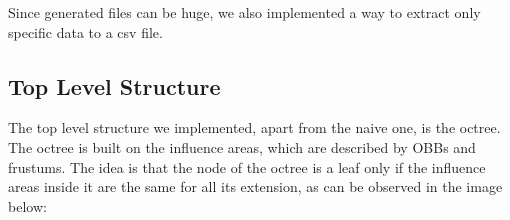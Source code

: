 \documentclass[11pt,a4paper,twocolumn]{article}
\begin{document}
Since generated files can be huge, we also implemented a way to extract only specific data to a csv file.

\subsection{Top Level Structure}
The top level structure we implemented, apart from the naive one, is the octree. The octree is built on the influence areas, which are described by OBBs and frustums. The idea is that the node of the octree is a leaf only if the influence areas inside it are the same for all its extension, as can be observed in the image below:

\begin{figure}[H]
    \centering 
	\qquad
\end{figure}
\end{document}
